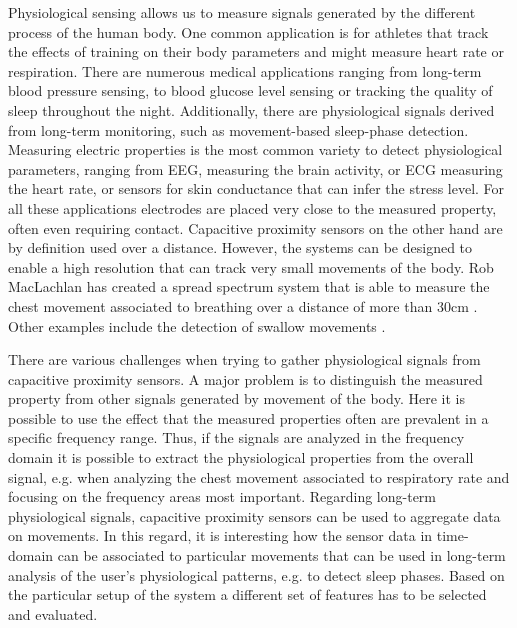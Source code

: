 Physiological sensing allows us to measure signals generated by the different process of the human body. One common application is for athletes that track the effects of training on their body parameters and might measure heart rate or respiration. There are numerous medical applications ranging from long-term blood pressure sensing, to blood glucose level sensing or tracking the quality of sleep throughout the night. Additionally, there are physiological signals derived from long-term monitoring, such as movement-based sleep-phase detection. Measuring electric properties is the most common variety to detect physiological parameters, ranging from EEG, measuring the brain activity, or ECG measuring the heart rate, or sensors for skin conductance that can infer the stress level. For all these applications electrodes are placed very close to the measured property, often even requiring contact. Capacitive proximity sensors on the other hand are by definition used over a distance. However, the systems can be designed to enable a high resolution that can track very small movements of the body. Rob MacLachlan has created a spread spectrum system that is able to measure the chest movement associated to breathing over a distance of more than 30cm \cite{MacLachlan2004}. Other examples include the detection of swallow movements \cite{cheng2010active}. 

There are various challenges when trying to gather physiological signals from capacitive proximity sensors. A major problem is to distinguish the measured property from other signals generated by movement of the body. Here it is possible to use the effect that the measured properties often are prevalent in a specific frequency range. Thus, if the signals are analyzed in the frequency domain it is possible to extract the physiological properties from the overall signal, e.g. when analyzing the chest movement associated to respiratory rate and focusing on the frequency areas most important. Regarding long-term physiological signals, capacitive proximity sensors can be used to aggregate data on movements. In this regard, it is interesting how the sensor data in time-domain can be associated to particular movements that can be used in long-term analysis of the user’s physiological patterns, e.g. to detect sleep phases. Based on the particular setup of the system a different set of features has to be selected and evaluated.

